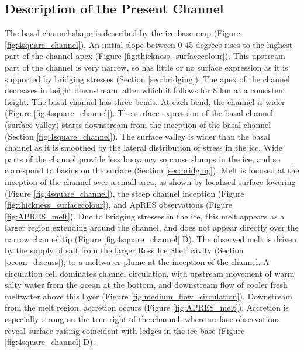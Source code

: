 \subsection{Description of the Present Channel}
The basal channel shape is described by the ice base map (Figure \ref{fig:4square_channel}). An initial slope between 0-45 degrees rises to the highest part of the channel apex (Figure \ref{fig:thickness_surfacecolour}). This upstream part of the channel is very narrow, so has little or no surface expression as it is supported by bridging stresses (Section \ref{sec:bridging}). The apex of the channel decreases in height downstream, after which it follows for 8 km at a consistent height.
The basal channel has three bends. At each bend, the channel is wider (Figure \ref{fig:4square_channel}).
The surface expression of the basal channel (surface valley) starts downstream from the inception of the basal channel (Section \ref{fig:4square_channel}). The surface valley is wider than the basal channel as it is smoothed by the lateral distribution of stress in the ice. Wide parts of the channel provide less buoyancy so cause slumps in the ice, and so correspond to basins on the surface (Section \ref{sec:bridging}).
Melt is focused at the inception of the channel over a small area, as shown by localised surface lowering (Figure \ref{fig:4square_channel}), the steep channel inception (Figure \ref{fig:thickness_surfacecolour}), and ApRES observations (Figure \ref{fig:APRES_melt}). Due to bridging stresses in the ice, this melt appears as a larger region extending around the channel, and does not appear directly over the narrow channel tip  (Figure \ref{fig:4square_channel} D). 
The observed melt is driven by the supply of salt from the larger Ross Ice Shelf cavity (Section \ref{ocean_discuss}), to a meltwater plume at the inception of the channel. A circulation cell dominates channel circulation, with upstream movement of warm salty water from the ocean at the bottom, and downstream flow of cooler fresh meltwater above this layer (Figure \ref{fig:medium_flow_circulation}). 
Downstream from the melt region, accretion occurs (Figure \ref{fig:APRES_melt}).
Accretion is especially strong on the true right of the channel, where surface observations reveal surface raising coincident with ledges in the ice base (Figure \ref{fig:4square_channel} D). 

